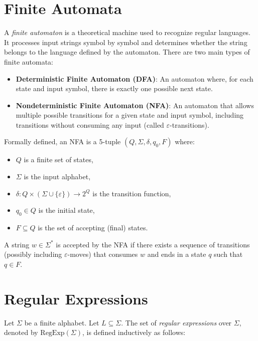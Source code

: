 \section{Finite Automata}
A \emph{finite automaton} is a theoretical machine used to recognize regular languages. It processes input strings symbol by symbol and determines whether the string belongs to the language defined by the automaton. There are two main types of finite automata:

\begin{itemize}
    \item \textbf{Deterministic Finite Automaton (DFA)}: An automaton where, for each state and input symbol, there is exactly one possible next state.
    \item \textbf{Nondeterministic Finite Automaton (NFA)}: An automaton that allows multiple possible transitions for a given state and input symbol, including transitions without consuming any input (called $\varepsilon$-transitions).
\end{itemize}

Formally defined, an NFA is a 5-tuple $(Q, \Sigma, \delta, q_0, F)$ where:

\begin{itemize}
    \item $Q$ is a finite set of states,
    \item $\Sigma$ is the input alphabet,
    \item $\delta: Q \times (\Sigma \cup \{\varepsilon\}) \rightarrow 2^Q$ is the transition function,
    \item $q_0 \in Q$ is the initial state,
    \item $F \subseteq Q$ is the set of accepting (final) states.
\end{itemize}

A string $w \in \Sigma^*$ is accepted by the NFA if there exists a sequence of transitions (possibly including $\varepsilon$-moves) that consumes $w$ and ends in a state $q$ such that $q \in F$.


\section{Regular Expressions}
Let $\Sigma$ be a finite alphabet. Let $L \subseteq \Sigma$. The set of \emph{regular expressions} over $\Sigma$, denoted by $\text{RegExp}(\Sigma)$, is defined inductively as follows:

